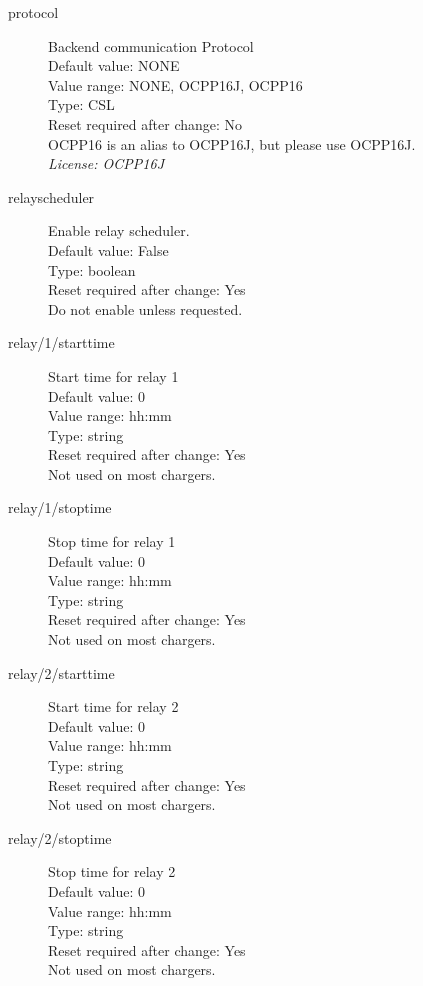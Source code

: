 \begin{description}
\item[protocol] Backend communication Protocol\\
  Default value: NONE\\
  Value range: NONE, OCPP16J, OCPP16\\
  Type: CSL\\
  Reset required after change: No\\
  OCPP16 is an alias to OCPP16J, but please use OCPP16J.\\
  \emph{License: OCPP16J}\\

\item[relayscheduler] Enable relay scheduler.\\
  Default value: False\\
  Type: boolean\\
  Reset required after change: Yes\\
  Do not enable unless requested.\\

\item[relay/1/starttime]  Start time for relay 1\\
  Default value: 0\\
  Value range: hh:mm\\
  Type: string\\
  Reset required after change: Yes\\
  Not used on most chargers.\\

\item[relay/1/stoptime] Stop time for relay 1\\
  Default value: 0\\
  Value range:  hh:mm\\
  Type: string\\
  Reset required after change: Yes\\
  Not used on most chargers.\\

\item[relay/2/starttime] Start time for relay 2\\
  Default value: 0\\
  Value range: hh:mm\\
  Type: string\\
  Reset required after change: Yes\\
  Not used on most chargers.\\

\item[relay/2/stoptime] Stop time for relay 2\\
  Default value: 0\\
  Value range:  hh:mm\\
  Type: string\\
  Reset required after change: Yes\\
  Not used on most chargers.\\


\end{description}
